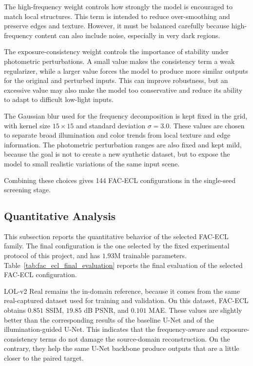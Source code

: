 The high-frequency weight controls how strongly the model is encouraged to match local structures. This term is intended to reduce over-smoothing and preserve edges and texture. However, it must be balanced carefully because high-frequency content can also include noise, especially in very dark regions.

The exposure-consistency weight controls the importance of stability under photometric perturbations. A small value makes the consistency term a weak regularizer, while a larger value forces the model to produce more similar outputs for the original and perturbed inputs. This can improve robustness, but an excessive value may also make the model too conservative and reduce its ability to adapt to difficult low-light inputs.

The Gaussian blur used for the frequency decomposition is kept fixed in the grid, with kernel size $15 \times 15$ and standard deviation $\sigma = 3.0$. These values are chosen to separate broad illumination and color trends from local texture and edge information. The photometric perturbation ranges are also fixed and kept mild, because the goal is not to create a new synthetic dataset, but to expose the model to small realistic variations of the same input scene.

Combining these choices gives 144 FAC-ECL configurations in the single-seed screening stage.

\subsection{Quantitative Analysis}

This subsection reports the quantitative behavior of the selected FAC-ECL family. The final configuration is the one selected by the fixed experimental protocol of this project, and has $1.93$M trainable parameters. Table~\ref{tab:fac_ecl_final_evaluation} reports the final evaluation of the selected FAC-ECL configuration.



LOL-v2 Real remains the in-domain reference, because it comes from the same real-captured dataset used for training and validation. On this dataset, FAC-ECL obtains $0.851$ SSIM, $19.85$ dB PSNR, and $0.101$ MAE. These values are slightly better than the corresponding results of the baseline U-Net and of the illumination-guided U-Net. This indicates that the frequency-aware and exposure-consistency terms do not damage the source-domain reconstruction. On the contrary, they help the same U-Net backbone produce outputs that are a little closer to the paired target.

